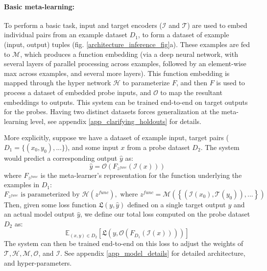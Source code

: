 \documentclass{article}
\begin{document}
\paragraph{Basic meta-learning:} To perform a basic task, input and target encoders ($\mathcal{I}$ and $\mathcal{T}$) are used to embed individual pairs from an example dataset \(D_1\), to form a dataset of example (input, output) tuples (fig. \ref{architecture_inference_fig}a). These examples are fed to $\mathcal{M}$, which produces a function embedding (via a deep neural network, with several layers of parallel processing across examples, followed by an element-wise max across examples, and several more layers). This function embedding is mapped through the hyper network $\mathcal{H}$ to parameterize $F$, and then $F$ is used to process a dataset of embedded probe inputs, and $\mathcal{O}$ to map the resultant embeddings to outputs. This system can be trained end-to-end on target outputs for the probes. Having two distinct datasets forces generalization at the meta-learning level, see appendix \ref{app_clarifying_holdouts} for details. \par 
More explicitly, suppose we have a dataset of example input, target pairs ($D_1 = \{(x_0, y_0), ...\}$), and some input $x$ from a probe dataset $D_2$. The system would predict a corresponding output $\hat{y}$ as: 
\[\hat{y} = \mathcal{O}\left(F_{z^{func}}\left(\mathcal{I} \left(x\right)\right) \right)\]
where $F_{z^{func}}$ is the meta-learner's representation for the function underlying the examples in $D_1$:
\[F_{z^{func}} \text{ is parameterized by } \mathcal{H}\left(z^{func}\right), \text{ where } z^{func} = \mathcal{M}\left( \left\{\left(\mathcal{I}\left(x_0\right), \mathcal{T}\left(y_0\right) \right), ... \right\}\right)\]
Then, given some loss function $\mathfrak{L}(y, \hat{y})$ defined on a single target output $y$ and an actual model output $\hat{y}$, we define our total loss computed on the probe dataset $D_2$ as: 
\[\mathbb{E}_{(x, y)\in {D}_2} \left[ \mathfrak{L}\left(y, \mathcal{O}\left(F_{D_1}\left(\mathcal{I} \left(x\right)\right) \right)\right)\right]\]
The system can then be trained end-to-end on this loss to adjust the weights of \(\mathcal{T,H,M,O}\), and \(\mathcal{I}\). See appendix \ref{app_model_details} for detailed architecture, and hyper-parameters. \par
\vspace{-0.25em}
\end{document}
